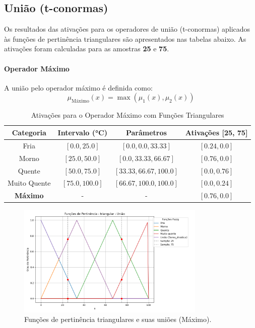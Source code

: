 \documentclass[a4paper,12pt]{article}
\begin{document}
\subsection{União (t-conormas)}

Os resultados das ativações para os operadores de união (t-conormas) aplicados às funções de pertinência triangulares são apresentados nas tabelas abaixo. As ativações foram calculadas para as amostras \textbf{25} e \textbf{75}.

\paragraph{Operador Máximo}

A união pelo operador máximo é definida como:
\[
\mu_{\text{Máximo}}(x) = \max(\mu_1(x), \mu_2(x))
\]

\begin{table}[H]
\centering
\caption{Ativações para o Operador Máximo com Funções Triangulares}
\begin{tabular}{|c|c|c|c|}
\hline
\textbf{Categoria}    & \textbf{Intervalo (°C)} & \textbf{Parâmetros}       & \textbf{Ativações [25, 75]} \\ \hline
Fria                  & $[0.0, 25.0]$          & $[0.0, 0.0, 33.33]$       & $[0.24, 0.0]$              \\ \hline
Morno                 & $[25.0, 50.0]$         & $[0.0, 33.33, 66.67]$     & $[0.76, 0.0]$              \\ \hline
Quente                & $[50.0, 75.0]$         & $[33.33, 66.67, 100.0]$   & $[0.0, 0.76]$              \\ \hline
Muito Quente          & $[75.0, 100.0]$        & $[66.67, 100.0, 100.0]$   & $[0.0, 0.24]$              \\ \hline
\textbf{Máximo} & -                     & -                         & $[0.76, 0.0]$             \\ \hline
\end{tabular}
\end{table}

\begin{figure}[H]
    \centering
    \includegraphics[width=0.8\textwidth]{img/funções_de_pertinência_triangular_união_fuzzificado.png}
    \caption{Funções de pertinência triangulares e suas uniões (Máximo).}
    \label{fig:uniao_maximo_triangular}
\end{figure}
\end{document}
